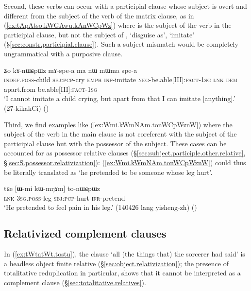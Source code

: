  Second, these verbs can occur with a participial clause whose subject is overt and different from the subject of the verb of the matrix clause, as in (\ref{ex:tApAtso.kWGAwu.kAnWCpWz}) where   is the subject of the verb  in the participial clause, but not the subject of  , `disguise as', `imitate' (§\ref{sec:constr.participial.clause}). Such a subject mismatch would be completely ungrammatical with a purposive clause.
 
\begin{exe}
\ex \label{ex:tApAtso.kWGAwu.kAnWCpWz}
  ʑo kɤ-nɯɕpɯz mɤ-spe-a ma nɯ mɯma spe-a \\
 \textsc{indef}.\textsc{poss}-child \textsc{sbj}:\textsc{pcp}-cry \textsc{emph} \textsc{inf}-imitate \textsc{neg}-be.able[III]:\textsc{fact}-\textsc{1sg} \textsc{lnk} \textsc{dem} apart.from be.able[III]:\textsc{fact}-\textsc{1sg} \\
\glt `I cannot imitate a child crying, but apart from that I can imitate [anything].' (27-kikakCi)
()
\end{exe}

Third, we find examples like (\ref{ex:Wmi.kWmNAm.tonWCpWznW}) where the subject of the verb in the main clause is not coreferent with the subject of the participial clause but with the possessor of the subject. These cases can be accounted for as possessor relative clauses (§\ref{sec:subject.participle.other.relative}, §\ref{sec:S.possessor.relativization}):  (\ref{ex:Wmi.kWmNAm.tonWCpWznW}) could thus be literally translated as `he pretended to be someone whose leg hurt'.

\begin{exe}
\ex \label{ex:Wmi.kWmNAm.tonWCpWznW}
 \gll  tɕe [\textbf{ɯ}-mi kɯ-mŋɤm] to-nɯɕpɯz  \\
 \textsc{lnk} \textsc{3sg}.\textsc{poss}-leg \textsc{sbj}:\textsc{pcp}-hurt \textsc{ifr}-pretend \\
 \glt `He pretended to feel pain in his leg.' (140426 lang yisheng-zh)
 ()
\end{exe}

 \subsection{Relativized complement clauses}  \label{sec:relativized.complement.clause}
In (\ref{ex:tWtatWt.tostu}),  the clause  `all (the things that) the sorcerer had said' is a headless object finite relative (§\ref{sec:object.relativization}); the presence of totalitative reduplication in particular, shows that it cannot be interpreted as a complement clause (§\ref{sec:totalitative.relatives}).

